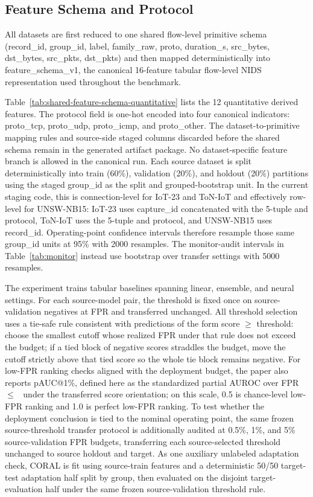\documentclass[10pt,conference]{IEEEtran}
\begin{document}
\subsection{Feature Schema and Protocol}

All datasets are first reduced to one shared flow-level primitive schema (record\_id, group\_id, label, family\_raw, proto, duration\_s, src\_bytes, dst\_bytes, src\_pkts, dst\_pkts) and then mapped deterministically into feature\_schema\_v1, the canonical 16-feature tabular flow-level NIDS representation used throughout the benchmark.



Table~\ref{tab:shared-feature-schema-quantitative} lists the 12 quantitative derived features. The protocol field is one-hot encoded into four canonical indicators: proto\_tcp, proto\_udp, proto\_icmp, and proto\_other. The dataset-to-primitive mapping rules and source-side staged columns discarded before the shared schema remain in the generated artifact package. No dataset-specific feature branch is allowed in the canonical run. Each source dataset is split deterministically into train (60\%), validation (20\%), and holdout (20\%) partitions using the staged group\_id as the split and grouped-bootstrap unit. In the current staging code, this is connection-level for IoT-23 and ToN-IoT and effectively row-level for UNSW-NB15: IoT-23 uses capture\_id concatenated with the 5-tuple and protocol, ToN-IoT uses the 5-tuple and protocol, and UNSW-NB15 uses record\_id. Operating-point confidence intervals therefore resample those same group\_id units at 95\% with 2000 resamples. The monitor-audit intervals in Table~\ref{tab:monitor} instead use bootstrap over transfer settings with 5000 resamples.

The experiment trains \ModelCount{} tabular baselines spanning linear, ensemble, and neural settings. For each source-model pair, the threshold is fixed once on source-validation negatives at \FrozenFprTarget{} FPR and transferred unchanged. All threshold selection uses a tie-safe rule consistent with predictions of the form score $\geq$ threshold: choose the smallest cutoff whose realized FPR under that rule does not exceed the budget; if a tied block of negative scores straddles the budget, move the cutoff strictly above that tied score so the whole tie block remains negative. For low-FPR ranking checks aligned with the deployment budget, the paper also reports pAUC@1\%, defined here as the standardized partial AUROC over FPR~$\leq$~\FrozenFprTarget{} under the transferred score orientation; on this scale, 0.5 is chance-level low-FPR ranking and 1.0 is perfect low-FPR ranking. To test whether the deployment conclusion is tied to the nominal operating point, the same frozen source-threshold transfer protocol is additionally audited at 0.5\%, 1\%, and 5\% source-validation FPR budgets, transferring each source-selected threshold unchanged to source holdout and target. As one auxiliary unlabeled adaptation check, CORAL is fit using source-train features and a deterministic 50/50 target-test adaptation half split by group, then evaluated on the disjoint target-evaluation half under the same frozen \FrozenFprTarget{} source-validation threshold rule.
\end{document}
